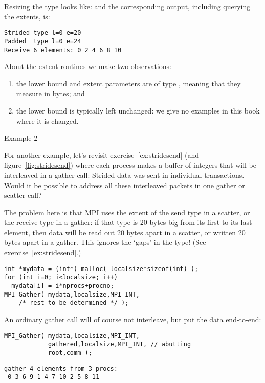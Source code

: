 Resizing the type looks like:
%
%
and the corresponding output,
including querying the extents,
is:
\begin{verbatim}
Strided type l=0 e=20
Padded  type l=0 e=24
Receive 6 elements: 0 2 4 6 8 10
\end{verbatim}

About the extent routines we make two observations:
\begin{enumerate}
\item the lower bound and extent parameters are of type ,
  meaning that they measure in bytes; and
\item the lower bound is typically left unchanged: we give no examples
  in this book where it is changed.
\end{enumerate}

 {Example 2}
\label{sec:extent-ex2}

For another example, let's revisit exercise~\ref{ex:stridesend}
(and  figure~\ref{fig:stridesend})
where each process makes a
buffer of integers that will be interleaved in a gather call:
Strided data was sent in individual transactions.
Would it be possible to address all these interleaved packets in one
gather or scatter call?

The problem here is that MPI uses the extent of the send type in a scatter,
or the receive type in a gather: if that type is 20 bytes big from
its first to its last element, then
data will be read out 20 bytes apart in a scatter, or written 20 bytes apart
in a gather. This ignores the `gaps' in the type!
(See exercise~\ref{ex:stridesend}.)

\begin{lstlisting}
int *mydata = (int*) malloc( localsize*sizeof(int) );
for (int i=0; i<localsize; i++)
  mydata[i] = i*nprocs+procno;
MPI_Gather( mydata,localsize,MPI_INT,
    /* rest to be determined */ );
\end{lstlisting}

An ordinary gather call will of course not interleave, but
put the data end-to-end:
\begin{lstlisting}
MPI_Gather( mydata,localsize,MPI_INT,
            gathered,localsize,MPI_INT, // abutting
            root,comm );
\end{lstlisting}
\begin{verbatim}
gather 4 elements from 3 procs:
 0 3 6 9 1 4 7 10 2 5 8 11
\end{verbatim}

